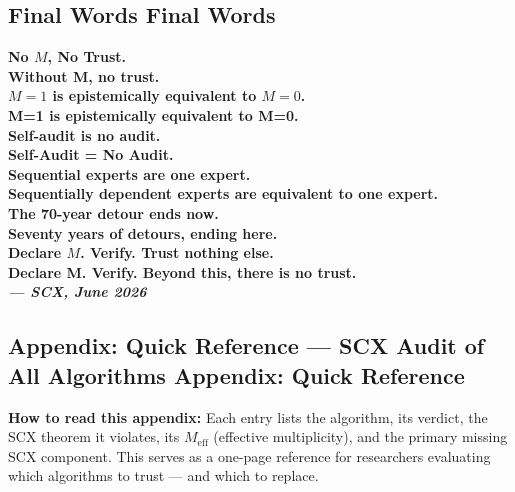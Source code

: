 \documentclass[12pt,a4paper]{article}
\theoremstyle{definition}
\newcommand{\SCX}{\textsc{SCX}}
\begin{document}
\subsection{Final Words Final Words}

\vspace{12pt}
\begin{center}
\large\bfseries
No $M$, No Trust.\\[2pt]
Without M, no trust.\\[8pt]
$M=1$ is epistemically equivalent to $M=0$.\\[2pt]
M=1 is epistemically equivalent to M=0.\\[8pt]
Self-audit is no audit.\\[2pt]
Self-Audit = No Audit.\\[8pt]
Sequential experts are one expert.\\[2pt]
Sequentially dependent experts are equivalent to one expert.\\[8pt]
The 70-year detour ends now.\\[2pt]
Seventy years of detours, ending here.\\[8pt]
Declare $M$. Verify. Trust nothing else.\\[2pt]
Declare M. Verify. Beyond this, there is no trust.\\[16pt]
\normalsize
\textit{— SCX, June 2026}
\end{center}

\subsection{Appendix: Quick Reference — SCX Audit of All Algorithms Appendix: Quick Reference}

\noindent\textbf{How to read this appendix:} Each entry lists the algorithm, its verdict, the \SCX{} theorem it violates, its $M_{\text{eff}}$ (effective multiplicity), and the primary missing SCX component. This serves as a one-page reference for researchers evaluating which algorithms to trust — and which to replace.
\end{document}
